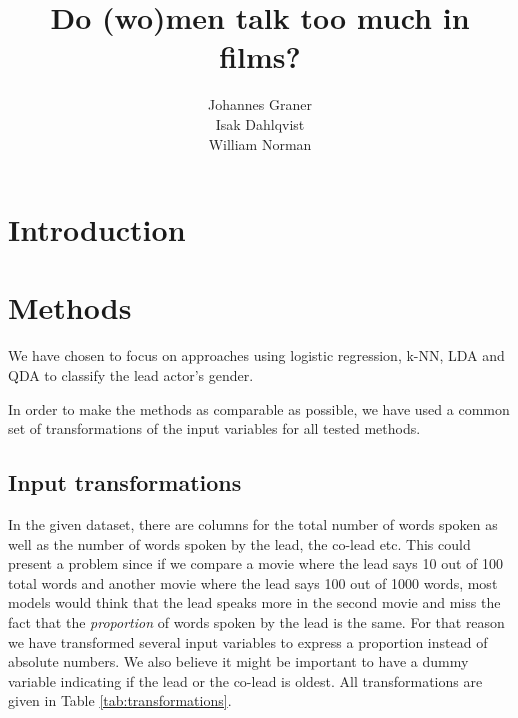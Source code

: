 \documentclass{article}
\title{Do (wo)men talk too much in films?}
\author{%
  Johannes Graner \\
  \And
  Isak Dahlqvist \\
  \AND
  William Norman \\
}
\begin{document}
\maketitle

\begin{abstract}
  
\end{abstract}

\newpage

\section{Introduction}

\section{Methods}
We have chosen to focus on approaches using logistic regression, k-NN, LDA and QDA to classify the lead actor's gender.

In order to make the methods as comparable as possible, we have used a common set of transformations of the input variables for all tested methods.

\subsection{Input transformations}
In the given dataset, there are columns for the total number of words spoken as well as the number of words spoken by the lead, the co-lead etc. This could present a problem since if we compare a movie where the lead says 10 out of 100 total words and another movie where the lead says 100 out of 1000 words, most models would think that the lead speaks more in the second movie and miss the fact that the \textit{proportion} of words spoken by the lead is the same. For that reason we have transformed several input variables to express a proportion instead of absolute numbers. We also believe it might be important to have a dummy variable indicating if the lead or the co-lead is oldest. All transformations are given in Table \ref{tab:transformations}.
\end{document}
